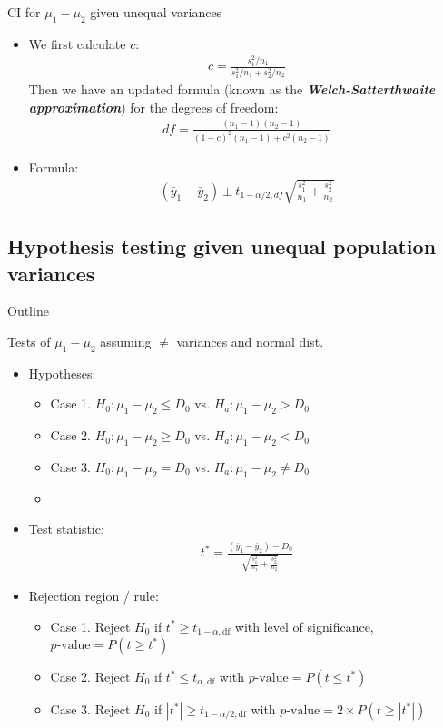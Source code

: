 \documentclass[xcolor=dvipsnames]{beamer}
\begin{document}
\begin{frame}{CI for $\mu_1-\mu_2$ given unequal variances}
	\begin{itemize}
		\item We first calculate $c$:
		\begin{align*}
		c = \frac{s_1^2 / n_1}{s_1^2 / n_1 + s_2^2/n_2}
		\end{align*}
		Then we have an updated formula (known as the \textbf{\emph{Welch-Satterthwaite approximation}}) for the degrees of freedom:
		\begin{align*}
		df = \frac{(n_1 -1)(n_2-1)}{(1-c)^2(n_1-1)+c^2(n_2-1)}
		\end{align*}
		\item Formula:
		\begin{align*}
			(\bar{y}_1-\bar{y}_2) \pm t_{1-\alpha / 2, df} \sqrt{\frac{s_1^2}{n_1}+\frac{s_2^2}{n_2}}
		\end{align*}
	\end{itemize}
\end{frame}

\subsection{Hypothesis testing given unequal population variances}
\begin{frame}{Outline}
\tableofcontents[currentsection,subsectionstyle=show/shaded/hide]
\end{frame}

\begin{frame}{Tests of $\mu_1 - \mu_2$ assuming $\neq$ variances and normal dist.}
\begin{itemize}
\item Hypotheses:
\begin{itemize}
	\item Case 1. $H_0: \mu_1 - \mu_2 \leq D_0$ vs. $H_a: \mu_1 - \mu_2 > D_0$
	\item Case 2. $H_0: \mu_1 - \mu_2 \geq D_0$ vs. $H_a: \mu_1 - \mu_2 < D_0$
	\item Case 3. $H_0: \mu_1 - \mu_2 = D_0$ vs. $H_a: \mu_1 - \mu_2 \neq D_0$
	\item[]
\end{itemize}
\item Test statistic:
\begin{align*}
t^* = \frac{(\bar{y}_1-\bar{y}_2)-D_0}{\sqrt{\frac{s^2_1}{n_1}+\frac{s^2_2}{n_2}}}
\end{align*}
\item Rejection region / rule:
\begin{itemize}
	\item Case 1. Reject $H_0$ if $t^* \geq t_{1-\alpha, \text{df}}$ with level of significance, $p\text{-value}=P(t \geq t^*)$
	\item Case 2. Reject $H_0$ if $t^* \leq t_{\alpha, \text{df} }$ with $p\text{-value}=P(t \leq t^*)$
	\item Case 3. Reject $H_0$ if $|t^*| \geq t_{1-\alpha / 2, \text{df}}$ with $p\text{-value}=2 \times P(t \geq |t^*|)$
\end{itemize}
\end{itemize}
\end{frame}
\end{document}
